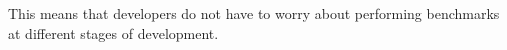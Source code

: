 This means that developers do not have to worry about performing benchmarks at different stages of development.



%
%
%
%
%
%
%
%
%
%
%
%
%
%
%
%
%
